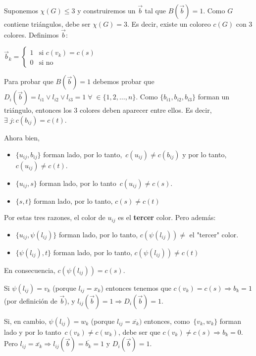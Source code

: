 \documentclass[10pt,a4paper]{article}
\begin{document}
Suponemos $\chi(G) \leq 3$ y construiremos un $\overrightarrow{b}$ tal que $B(\overrightarrow{b}) = 1$. Como $G$ contiene triángulos, debe ser $\chi(G) = 3$. Es decir, existe un coloreo $c(G)$ con 3 colores. Definimos $\overrightarrow{b}$:

\begin{center}
$\overrightarrow{b}_k = \begin{cases} 1 & \text{si } c(v_k) = c(s)\\ 0 & \text{si no} \end{cases}$
\end{center}

Para probar que $B(\overrightarrow{b}) = 1$ debemos probar que $D_i(\overrightarrow{b}) = l_{i1} \lor l_{i2} \lor l_{i3} = 1 \;\forall\; \in \{1, 2, \dots, n\}$. Como $\{b_{i1}, b_{i2}, b_{i3}\}$ forman un triángulo, entonces los 3 colores deben aparecer entre ellos. Es decir, $\exists \; j : c(b_{ij}) = c(t)$.

Ahora bien,

\begin{itemize}

	\item $\{u_{ij}, b_{ij}\}$ forman lado, por lo tanto, $c(u_{ij}) \neq c(b_{ij})$ y por lo tanto, $c(u_{ij}) \neq c(t)$.
	\item $\{u_{ij}, s\}$ forman lado, por lo tanto $c(u_{ij}) \neq c(s)$.
	\item $\{s, t\}$ forman lado, por lo tanto, $c(s) \neq c(t)$
\end{itemize}

Por estas tres razones, el color de $u_{ij}$ es el \textbf{tercer} color. Pero además:

\begin{itemize}

	\item $\{u_{ij}, \psi(l_{ij})\}$ forman lado, por lo tanto, $c(\psi(l_{ij})) \neq $ el "tercer" color.
	\item $\{\psi(l_{ij}), t\}$ forman lado, por lo tanto, $c(\psi(l_{ij})) \neq c(t)$
\end{itemize}

En consecuencia, $c(\psi(l_{ij}))= c(s)$.

Si $\psi(l_{ij}) = v_k$ (porque $l_{ij} = x_k$) entonces tenemos que $c(v_k) = c(s) \Rightarrow b_k = 1$ (por definición de $\overrightarrow{b}$), y $l_{ij}(\overrightarrow{b}) = 1 \Rightarrow D_i(\overrightarrow{b}) = 1$.

Si, en cambio, $\psi(l_{ij}) = w_k$ (porque $l_{ij} = \overline{x_k})$ entonces, como $\{v_k, w_k\}$ forman lado y por lo tanto $c(v_k) \neq c(w_k)$, debe ser que $c(v_k) \neq c(s) \Rightarrow b_k = 0$. Pero $l_{ij} = \overline{x_k} \Rightarrow l_{ij}(\overrightarrow{b}) = \overline{b_k} = 1$ y $D_i(\overrightarrow{b}) = 1$.
\end{document}
